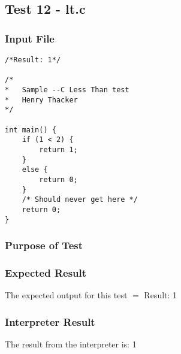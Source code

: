 \subsection{Test 12 - lt.c}
\subsubsection{Input File}
\begin{lstlisting}[showstringspaces=false,breaklines=true,backgroundcolor=\color{light-gray}, captionpos=b]
/*Result: 1*/

/*
*	Sample --C Less Than test
*	Henry Thacker
*/

int main() {
	if (1 < 2) {
		return 1;
	}
	else {
		return 0;
	}
	/* Should never get here */
	return 0;
}
\end{lstlisting}\subsubsection{Purpose of Test}

\subsubsection{Expected Result}
The expected output for this test $=$ Result: 1
\subsubsection{Interpreter Result}
The result from the interpreter is: 1
